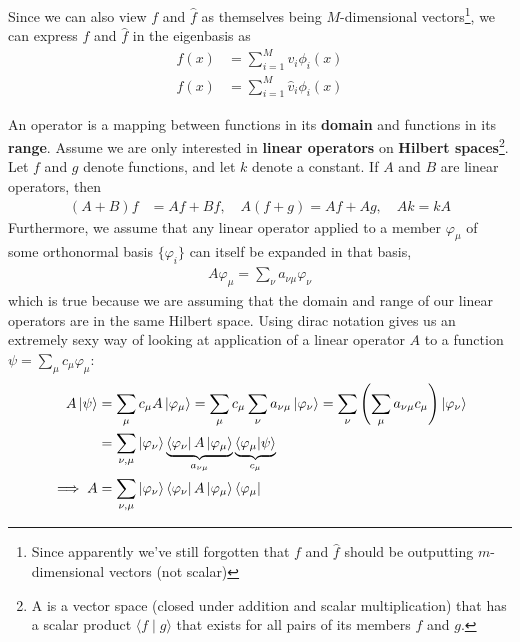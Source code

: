 \documentclass[11pt]{article}
\begin{document}
Since we can also view $f$ and $\hat f$ as themselves being $M$-dimensional vectors\footnote{Since apparently we've still forgotten that $f$ and $\hat f$ should be outputting $m$-dimensional vectors (not scalar)}, we can express $f$ and $\hat f$ in the eigenbasis as
\begin{align}
	f(x) 
		&= \sum_{i=1}^M v_i \phi_i(x) \\
	\hat f(x)
		&= \sum_{i=1}^{M} \hat v_i \phi_i(x)
\end{align}

\myspace 
{}


\begin{example}
	An operator is a mapping between functions in its \textbf{domain} and functions in its \textbf{range}. Assume we are only interested in \textbf{linear operators} on \textbf{Hilbert spaces}\footnote{A is a vector space (closed under addition and scalar multiplication) that has a scalar product $\langle f \mid g \rangle$ that exists for all pairs of its members $f$ and $g$.}. Let $f$ and $g$ denote functions, and let $k$ denote a constant. If $A$ and $B$ are linear operators, then
	\begin{align}
		(A + B)f
		&= Af + Bf,
		\quad 
		A(f + g) = Af + Ag, 
		\quad 
		Ak = kA
	\end{align}
	Furthermore, we assume that any linear operator applied to a member $\varphi_\mu$ of some orthonormal basis $\{\varphi_i \}$ can itself be expanded in that basis,
	\begin{align}
		A \varphi_\mu = \sum_{\nu} a_{\nu\mu} \varphi_\nu 
	\end{align}
	which is true because we are assuming that the domain and range of our linear operators are in the same Hilbert space. Using dirac notation gives us an extremely sexy way of looking at application of a linear operator $A$ to a function $\psi = \sum_\mu c_\mu \varphi_\mu$:
	\begin{align}
		A  \ket\psi 
		&= \sum_\mu c_{\mu} A \ket{\varphi_\mu} = \sum_\mu c_{\mu} \sum_\nu a_{\nu\mu} \ket{\varphi_{\nu}}
		= \sum_{\nu} \left( \sum_\mu a_{\nu\mu} c_\mu \right) \ket{\varphi_\nu } \\
		&= \sum_{\nu,\mu} \ket{\varphi_\nu} 
		\underbrace{\bra{\varphi_\nu}A \ket{\varphi_\mu}}_{a_{\nu\mu}}
		\underbrace{\braket{\varphi_\mu |  \psi}}_{c_\mu} \\
		\implies 
		A &= \sum_{\nu,\mu} \ket{\varphi_\nu} \bra{\varphi_\nu}A \ket{\varphi_\mu} \bra{\varphi_\mu}
	\end{align}
\end{example}
\end{document}
